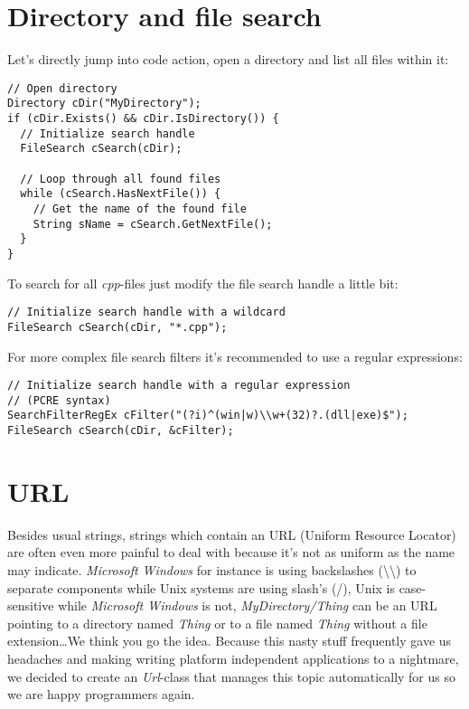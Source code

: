 \section{Directory and file search}
Let's directly jump into code action, open a directory and list all files within it:

\begin{lstlisting}[caption=Directory and file search usage example]
// Open directory
Directory cDir("MyDirectory");
if (cDir.Exists() && cDir.IsDirectory()) {
  // Initialize search handle
  FileSearch cSearch(cDir);

  // Loop through all found files
  while (cSearch.HasNextFile()) {
    // Get the name of the found file
    String sName = cSearch.GetNextFile();
  }
}
\end{lstlisting}

To search for all \emph{cpp}-files just modify the file search handle a little bit:

\begin{lstlisting}[caption=Wildcard search handle]
// Initialize search handle with a wildcard
FileSearch cSearch(cDir, "*.cpp");
\end{lstlisting}

For more complex file search filters it's recommended to use a regular expressions:

\begin{lstlisting}[caption=Regular expression search handle]
// Initialize search handle with a regular expression
// (PCRE syntax)
SearchFilterRegEx cFilter("(?i)^(win|w)\\w+(32)?.(dll|exe)$");
FileSearch cSearch(cDir, &cFilter);
\end{lstlisting}




\section{URL}
Besides usual strings, strings which contain an URL (Uniform Resource Locator) are often even more painful to deal with because it's not as uniform as the name may indicate. \emph{Microsoft Windows} for instance is using backslashes (\textbackslash\textbackslash) to separate components while Unix systems are using slash's (/), Unix is case-sensitive while \emph{Microsoft Windows} is not, \emph{MyDirectory/Thing} can be an URL pointing to a directory named \emph{Thing} or to a file named \emph{Thing} without a file extension\ldots We think you go the idea. Because this nasty stuff frequently gave us headaches and making writing platform independent applications to a nightmare, we decided to create an \emph{Url}-class that manages this topic automatically for us so we are happy programmers again.

